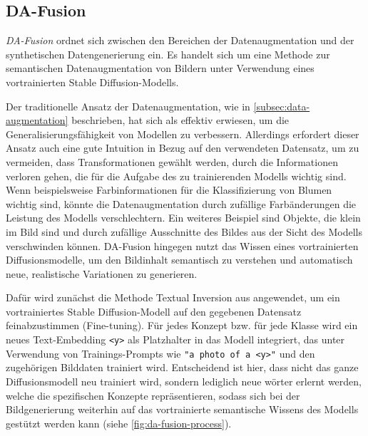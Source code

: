 
\subsection{DA-Fusion} \label{subsec:da-fusion}

\emph{DA-Fusion} \parencite{Trabucco2023dafusion} ordnet sich zwischen den Bereichen der Datenaugmentation und der synthetischen Datengenerierung ein. Es handelt sich um eine Methode zur semantischen Datenaugmentation von Bildern unter Verwendung eines vortrainierten Stable Diffusion-Modells. 

Der traditionelle Ansatz der Datenaugmentation, wie in \autoref{subsec:data-augmentation} beschrieben, hat sich als effektiv erwiesen, um die Generalisierungsfähigkeit von Modellen zu verbessern. Allerdings erfordert dieser Ansatz auch eine gute Intuition in Bezug auf den verwendeten Datensatz, um zu vermeiden, dass Transformationen gewählt werden, durch die Informationen verloren gehen, die für die Aufgabe des zu trainierenden Modells wichtig sind. Wenn beispielsweise Farbinformationen für die Klassifizierung von Blumen wichtig sind, könnte die Datenaugmentation durch zufällige Farbänderungen die Leistung des Modells verschlechtern. Ein weiteres Beispiel sind Objekte, die klein im Bild sind und durch zufällige Ausschnitte des Bildes aus der Sicht des Modells verschwinden können. DA-Fusion hingegen nutzt das Wissen eines vortrainierten Diffusionsmodelle, um den Bildinhalt semantisch zu verstehen und automatisch neue, realistische Variationen zu generieren.


Dafür wird zunächst die Methode Textual Inversion aus \parencite{Gal2022textualinversion} angewendet, um ein vortrainiertes Stable Diffusion-Modell auf den gegebenen Datensatz feinabzustimmen (Fine-tuning). Für jedes Konzept bzw. für jede Klasse wird ein neues Text-Embedding \lstinline|<y>| als Platzhalter in das Modell integriert, das unter Verwendung von Trainings-Prompts wie \lstinline|"a photo of a <y>"| und den zugehörigen Bilddaten trainiert wird. Entscheidend ist hier, dass nicht das ganze Diffusionsmodell neu trainiert wird, sondern lediglich neue wörter erlernt werden, welche die spezifischen Konzepte repräsentieren, sodass sich bei der Bildgenerierung weiterhin auf das vortrainierte semantische Wissens des Modells gestützt werden kann (siehe \autoref{fig:da-fusion-process}).

